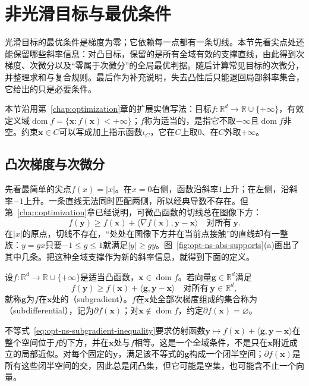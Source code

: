 \section{非光滑目标与最优条件}
\label{sec:opt-ns-optimality}

光滑目标的最优条件是梯度为零；它依赖每一点都有一条切线。本节先看尖点处还能保留哪些斜率信息：对凸目标，保留的是所有全域有效的支撑直线，由此得到次梯度、次微分以及“零属于次微分”的全局最优判据。随后计算常见目标的次微分，并整理求和与复合规则。最后作为补充说明，失去凸性后只能退回局部斜率集合，它给出的只是必要条件。

本节沿用第~\ref{chap:optimization}章的扩展实值写法：目标$f:\mathbb R^d\to\mathbb R\cup\{+\infty\}$，有效定义域$\operatorname{dom}f=\{\bm x:f(\bm x)<+\infty\}$；$f$称为适当的，是指它不取$-\infty$且$\operatorname{dom}f$非空。约束$\bm x\in C$可以写成加上指示函数$\iota_C$，它在$C$上取$0$、在$C$外取$+\infty$。

\subsection{凸次梯度与次微分}
\label{sec:opt-ns-subgradient-def}

先看最简单的尖点$f(x)=|x|$。在$x=0$右侧，函数沿斜率$1$上升；在左侧，沿斜率$-1$上升。一条直线无法同时匹配两侧，所以经典导数不存在。但第~\ref{chap:optimization}章已经说明，可微凸函数的切线总在图像下方：
\[
 f(\bm y)\geq f(\bm x)+\langle\nabla f(\bm x),\bm y-\bm x\rangle\quad\text{对所有}\ \bm y.
\]
在$|x|$的原点，切线不存在，“处处在图像下方并在当前点接触”的直线却有一整族：$y=gx$只要$-1\leq g\leq1$就满足$|y|\geq gy$。图~\ref{fig:opt-ns-abs-supports}(a)画出了其中几条。把这种全域支撑作为新的斜率信息，就得到下面的定义。

\begin{definition}[次梯度与次微分]
\label{def:opt-ns-subgradient}
设$f:\mathbb R^d\to\mathbb R\cup\{+\infty\}$是适当凸函数，$\bm x\in\operatorname{dom}f$。若向量$\bm g\in\mathbb R^d$满足
\begin{equation}
 f(\bm y)\geq f(\bm x)+\langle\bm g,\bm y-\bm x\rangle\quad\text{对所有}\ \bm y\in\mathbb R^d,
 \label{eq:opt-ns-subgradient-inequality}
\end{equation}
就称$\bm g$为$f$在$\bm x$处的（subgradient）。$f$在$\bm x$处全部次梯度组成的集合称为（subdifferential），记为$\partial f(\bm x)$；对$\bm x\notin\operatorname{dom}f$，约定$\partial f(\bm x)=\varnothing$。
\end{definition}

不等式~\eqref{eq:opt-ns-subgradient-inequality}要求仿射函数$\bm y\mapsto f(\bm x)+\langle\bm g,\bm y-\bm x\rangle$在整个空间位于$f$的下方，并在$\bm x$处与$f$相等。这是一个全域条件，不是只在$\bm x$附近成立的局部近似。对每个固定的$\bm y$，满足该不等式的$\bm g$构成一个闭半空间；$\partial f(\bm x)$是所有这些闭半空间的交，因此总是闭凸集，但它可能是空集，也可能含不止一个向量。

